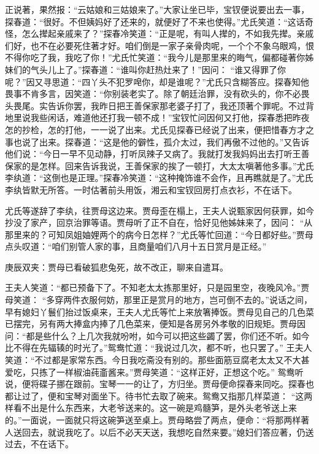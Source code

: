 \begin{parag}
    正说著，果然报：“云姑娘和三姑娘来了。”大家让坐已毕，宝钗便说要出去一事，探春道：“很好。不但姨妈好了还来的，就便好了不来也使得。”尤氏笑道：“这话奇怪，怎么撵起亲戚来了？”探春冷笑道：“正是呢，有叫人撵的，不如我先撵。亲戚们好，也不在必要死住著才好。咱们倒是一家子亲骨肉呢，一个个不象乌眼鸡，恨不得你吃了我，我吃了你！”尤氏忙笑道：“我今儿是那里来的晦气，偏都碰著你姊妹们的气头儿上了。”探春道：“谁叫你赶热灶来了！”因问： “谁又得罪了你呢？”因又寻思道：“四丫头不犯罗唣你，却是谁呢？”尤氏只含糊答应。探春知他畏事不肯多言，因笑道：“你别装老实了。除了朝廷治罪，没有砍头的，你不必畏头畏尾。实告诉你罢，我昨日把王善保家那老婆子打了，我还顶著个罪呢。不过背地里说我些闲话，难道他还打我一顿不成！”宝钗忙问因何又打他，探春悉把昨夜怎的抄检，怎的打他，一一说了出来。尤氏见探春已经说了出来，便把惜春方才之事也说了出来。探春道：“这是他的僻性，孤介太过，我们再傲不过他的。”又告诉他们说：“今日一早不见动静，打听凤辣子又病了。我就打发我妈妈出去打听王善保家的是怎样。回来告诉我说，王善保家的挨了一顿打，大太太嗔著他多事。”尤氏李纨道：“这倒也是正理。”探春冷笑道：“这种掩饰谁不会作，且再瞧就是了。”尤氏李纨皆默无所答。一时估著前头用饭，湘云和宝钗回房打点衣衫，不在话下。
\end{parag}


\begin{parag}
    尤氏等遂辞了李纨，往贾母这边来。贾母歪在榻上，王夫人说甄家因何获罪，如今抄没了家产，回京治罪等语。贾母听了正不自在，恰好见他姊妹来了，因问： “从那里来的？可知凤姐妯娌两个的病今日怎样？”尤氏等忙回道：“今日都好些。”贾母点头叹道：“咱们别管人家的事，且商量咱们八月十五日赏月是正经。”\begin{note}庚辰双夹：贾母已看破狐悲兔死，故不改正，聊来自遣耳。\end{note}王夫人笑道：“都已预备下了。不知老太太拣那里好，只是园里空，夜晚风冷。”贾母笑道： “多穿两件衣服何妨，那里正是赏月的地方，岂可倒不去的。”说话之间，早有媳妇丫鬟们抬过饭桌来，王夫人尤氏等忙上来放箸捧饭。贾母见自己的几色菜已摆完，另有两大捧盒内捧了几色菜来，便知是各房另外孝敬的旧规矩。贾母因问：“都是些什么？上几次我就吩咐，如今可以把这些蠲了罢，你们还不听。如今比不得在先辐辏的时光了。”鸳鸯忙道：“我说过几次，都不听，也只罢了。” 王夫人笑道：“不过都是家常东西。今日我吃斋没有别的。那些面筋豆腐老太太又不大甚爱吃，只拣了一样椒油莼齑酱来。”贾母笑道：“这样正好，正想这个吃。” 鸳鸯听说，便将碟子挪在跟前。宝琴一一的让了，方归坐。贾母便命探春来同吃。探春也都让过了，便和宝琴对面坐下。待书忙去取了碗来。鸳鸯又指那几样菜道： “这两样看不出是什么东西来，大老爷送来的。这一碗是鸡髓笋，是外头老爷送上来的。”一面说，一面就只将这碗笋送至桌上。贾母略尝了两点，便命：“将那两样著人送回去，就说我吃了。以后不必天天送，我想吃自然来要。”媳妇们答应著，仍送过去，不在话下。
\end{parag}


